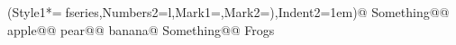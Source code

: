 \documentclass[preview]{standalone}
\begin{document}
\begin{center}
\begin{easylist}\ListProperties(Style1*=fseries,Numbers2=l,Mark1={},Mark2={)},Indent2=1em)@ Something@@ apple@@ pear@@ banana@ Something@@ Frogs\end{easylist}
\end{center}
\end{document}
